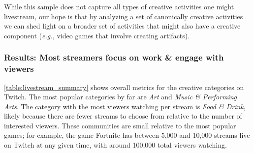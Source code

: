 While this sample does not capture all types of creative activities one might livestream, our hope is that by analyzing a set of canonically creative activities we can shed light on a broader set of activities that might also have a creative component (\textit{e.g., } video games that involve creating artifacts).

\subsubsection{Results: Most streamers focus on work \& engage with viewers}
\autoref{table:livestream_summary} shows overall metrics for the creative categories on Twitch. The most popular categories by far are \textit{Art} and \textit{Music \& Performing Arts}. The category with the most viewers watching per stream is \textit{Food \& Drink}, likely because there are fewer streams to choose from relative to the number of interested viewers. These communities are small relative to the most popular games; for example, the game Fortnite has between 5,000 and 10,000 streams live on Twitch at any given time, with around 100,000 total viewers watching. %

